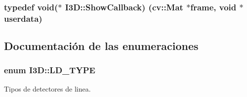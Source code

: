 \subsubsection[{\texorpdfstring{Show\+Callback}{ShowCallback}}]{\setlength{\rightskip}{0pt plus 5cm}typedef void($\ast$ I3\+D\+::\+Show\+Callback) (cv\+::\+Mat $\ast$frame, void $\ast$userdata)}\hypertarget{namespace_i3_d_a65da91c3d8b7751e061aa6d8462ea890}{}\label{namespace_i3_d_a65da91c3d8b7751e061aa6d8462ea890}


\subsection{Documentación de las enumeraciones}
\subsubsection[{\texorpdfstring{L\+D\+\_\+\+T\+Y\+PE}{LD_TYPE}}]{\setlength{\rightskip}{0pt plus 5cm}enum {\bf I3\+D\+::\+L\+D\+\_\+\+T\+Y\+PE}\hspace{0.3cm}{\ttfamily [strong]}}\hypertarget{namespace_i3_d_ac3913218d62e4e56ed38931636256ae2}{}\label{namespace_i3_d_ac3913218d62e4e56ed38931636256ae2}


Tipos de detectores de linea. 

